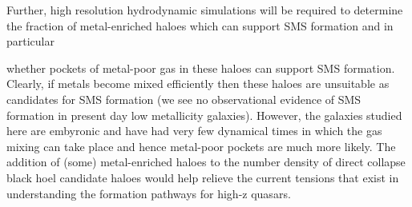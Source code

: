  \indent Further, high resolution hydrodynamic simulations will be required to
determine the fraction of metal-enriched haloes which can support SMS formation and in particular
 
whether pockets of metal-poor gas in these haloes can support SMS formation. Clearly, if metals
  become mixed efficiently then these haloes are unsuitable as candidates for SMS formation (we see
no observational evidence of SMS formation in present day low metallicity galaxies). However,
the galaxies studied here are embyronic and have had very few dynamical times in which the
gas mixing can take place and hence metal-poor pockets are much more likely. The addition of (some)
metal-enriched haloes to the number density of direct collapse black hoel candidate haloes
would help relieve the current tensions that exist in understanding the formation pathways for
high-z quasars. 
